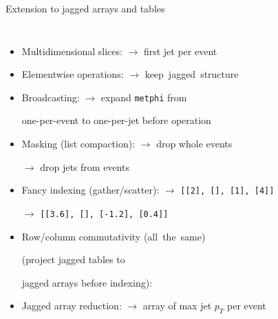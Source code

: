 \documentclass[aspectratio=169]{beamer}
\begin{document}
\begin{frame}{Extension to jagged arrays and tables}
\vspace{0.1 cm}
\begin{columns}
\begin{itemize}\setlength{\itemsep}{0.15 cm}
\item Multidimensional slices:  $\to$ first jet per event
\item Elementwise operations:  $\to$ \mbox{keep jagged structure\hspace{-1 cm}}
\item Broadcasting:  $\to$ expand {\small \texttt{metphi}} from

\tabto{5.5 cm}one-per-event to one-per-jet before operation

\item Masking (list compaction):  $\to$ drop whole events

 $\to$ drop jets from events

\item Fancy indexing (gather/scatter):  $\to$ \mbox{\small \texttt{[[2], [], [1], [4]]}\hspace{-0.5 cm}}

 $\to$ \mbox{\small \texttt{[[3.6], [], [-1.2], [0.4]]}\hspace{-0.5 cm}}

\item Row/column commutativity  \mbox{(all the same)\hspace{-0.5 cm}}

(project jagged tables to 

jagged arrays before indexing): 



\item Jagged array reduction:  $\to$ array of max jet $p_T$ per event
\end{itemize}
\end{columns}
\end{frame}
\end{document}
